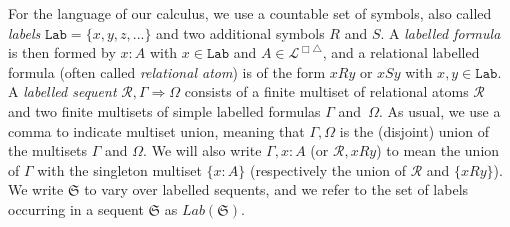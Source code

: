 \documentclass[runningheads,orivec]{llncs}
\newcommand{\Ra}{\Rightarrow}
\newcommand{\R}{\mathcal{R}}
\newcommand{\La}{\mathcal{L}}
\newcommand{\Seq}{\mathfrak{S}}
\newcommand{\LaBi}{\La^{\Box \triangle}}
\newcommand{\Var}{\mathtt{Lab}}
\begin{document}
For the language of our calculus, we use a countable set of symbols, also called \textit{labels} $\Var=\{x,y,z,...\}$ and two additional symbols $R$ and $S$. A \textit{labelled formula} is then formed by $x:A$ with $x \in \Var$ and $A \in \LaBi$, and a relational labelled formula (often called \textit{relational atom}) is of the form $xRy$ or $xSy$ with $x,y \in \Var$. A \textit{labelled sequent} $\R , \Gamma \Ra \Omega$ consists of a finite multiset of relational atoms $\R$ and two finite multisets of simple labelled formulas $\Gamma $ and~$\Omega$. As usual, we use a comma to indicate multiset union, meaning that $\Gamma, \Omega$ is the (disjoint) union of the multisets $\Gamma$ and $ \Omega$. 
We will also write $\Gamma , x :A$ (or $\R, xRy$) to mean the union of $\Gamma$ with the singleton multiset $\{x:A\}$ (respectively the union of $\R$ and $\{xRy\}$).
We write $\Seq$ to vary over labelled sequents, and we refer to the set of labels occurring in a sequent $\Seq$ as $Lab(\Seq)$.  
\end{document}
